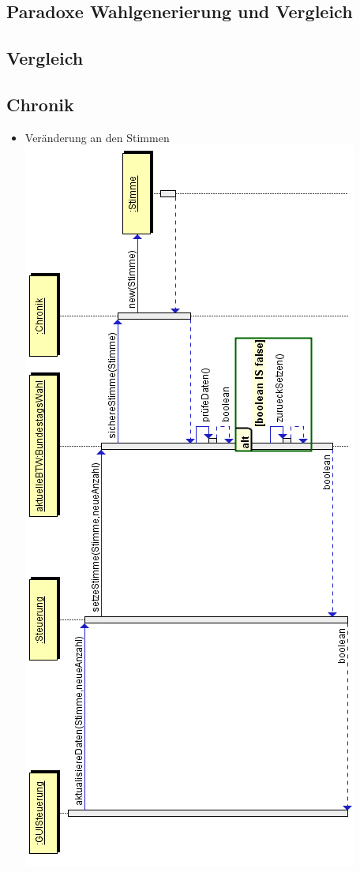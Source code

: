 \documentclass[12pt,a4paper,titlepage]{article}
\begin{document}
\newpage
\subsection{Paradoxe Wahlgenerierung und Vergleich}

\newpage
\subsection{Vergleich}

\newpage
\subsection{Chronik}
\begin{itemize}
	\item Veränderung an den Stimmen \\
		\includegraphics[scale=0.7]{Sequenzdiagramme/Chronik_Sequenzdiagramm-stimmenaendern.png}

\end{itemize}
\end{document}
